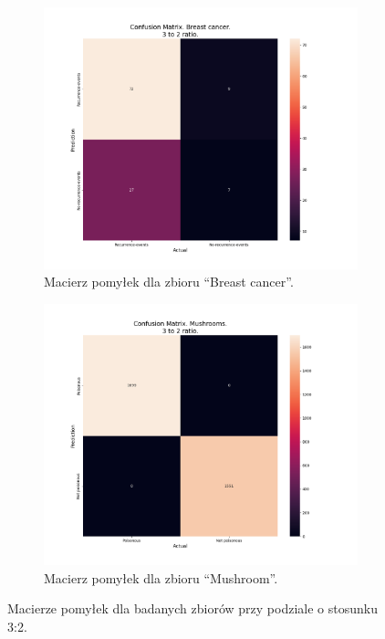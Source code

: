 \begin{figure}[h!]
	\centering
	\begin{subfigure}[b]{0.7\linewidth}
		\includegraphics[width=\linewidth]{photos/bre_3_to_2_r.png}
		\caption{Macierz pomyłek dla zbioru ``Breast cancer''.}
	\end{subfigure}
	\begin{subfigure}[b]{0.7\linewidth}
		\includegraphics[width=\linewidth]{photos/mush_3_to_2_r.png}
		\caption{Macierz pomyłek dla zbioru ``Mushroom''.}
	\end{subfigure}
        \caption{Macierze pomyłek dla badanych zbiorów przy podziale o stosunku 3:2.}
\end{figure}

